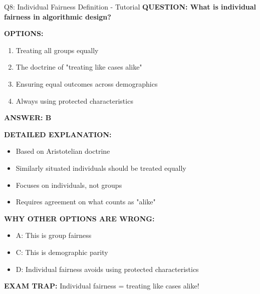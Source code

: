 \documentclass[8pt]{beamer}
\begin{document}
	\begin{frame}{Q8: Individual Fairness Definition - Tutorial}
		\fontsize{6.5}{7.5}\selectfont
		\textbf{QUESTION: What is individual fairness in algorithmic design?}
		
		\vspace{0.1cm}
		\textbf{OPTIONS:}
		\begin{enumerate}
			\item Treating all groups equally
			\item The doctrine of "treating like cases alike"
			\item Ensuring equal outcomes across demographics
			\item Always using protected characteristics
		\end{enumerate}
		
		\vspace{0.1cm}
		\textcolor{myblue}{\textbf{ANSWER: B}}
		
		\vspace{0.1cm}
		\textbf{DETAILED EXPLANATION:}
		\begin{itemize}
			\item Based on Aristotelian doctrine
			\item Similarly situated individuals should be treated equally
			\item Focuses on individuals, not groups
			\item Requires agreement on what counts as "alike"
		\end{itemize}
		
		\vspace{0.1cm}
		\textcolor{myred}{\textbf{WHY OTHER OPTIONS ARE WRONG:}}
		\begin{itemize}
			\item \textcolor{myred}{A:} This is group fairness
			\item \textcolor{myred}{C:} This is demographic parity
			\item \textcolor{myred}{D:} Individual fairness avoids using protected characteristics
		\end{itemize}
		
		\textcolor{myred}{\textbf{EXAM TRAP:}} Individual fairness = \textcolor{myblue}{treating like cases alike}!
	\end{frame}
	
\end{document}
